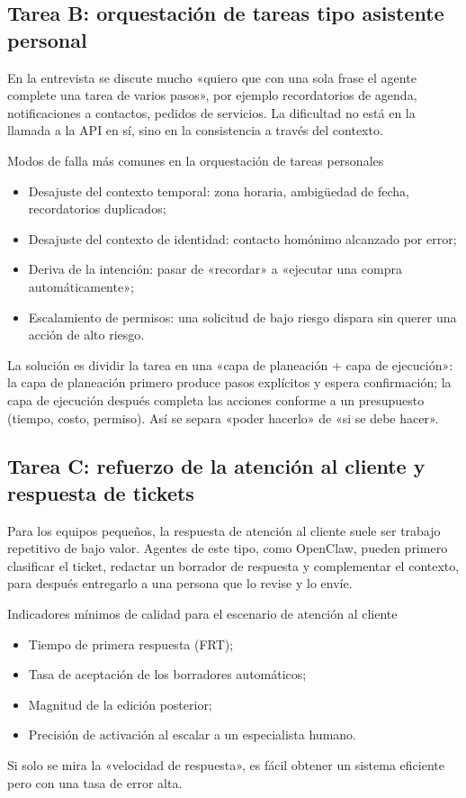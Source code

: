\documentclass[a4paper]{article}
\begin{document}
\subsection{Tarea B: orquestación de tareas tipo asistente personal}

En la entrevista se discute mucho «quiero que con una sola frase el agente complete una tarea de varios pasos», por ejemplo recordatorios de agenda, notificaciones a contactos, pedidos de servicios. La dificultad no está en la llamada a la API en sí, sino en la consistencia a través del contexto.

\begin{warningbox}{Modos de falla más comunes en la orquestación de tareas personales}
\begin{itemize}
    \item Desajuste del contexto temporal: zona horaria, ambigüedad de fecha, recordatorios duplicados;
    \item Desajuste del contexto de identidad: contacto homónimo alcanzado por error;
    \item Deriva de la intención: pasar de «recordar» a «ejecutar una compra automáticamente»;
    \item Escalamiento de permisos: una solicitud de bajo riesgo dispara sin querer una acción de alto riesgo.
\end{itemize}
\end{warningbox}

La solución es dividir la tarea en una «capa de planeación + capa de ejecución»: la capa de planeación primero produce pasos explícitos y espera confirmación; la capa de ejecución después completa las acciones conforme a un presupuesto (tiempo, costo, permiso). Así se separa «poder hacerlo» de «si se debe hacer».

\subsection{Tarea C: refuerzo de la atención al cliente y respuesta de tickets}

Para los equipos pequeños, la respuesta de atención al cliente suele ser trabajo repetitivo de bajo valor. Agentes de este tipo, como OpenClaw, pueden primero clasificar el ticket, redactar un borrador de respuesta y complementar el contexto, para después entregarlo a una persona que lo revise y lo envíe.

\begin{knowledgebox}{Indicadores mínimos de calidad para el escenario de atención al cliente}
\begin{itemize}
    \item Tiempo de primera respuesta (FRT);
    \item Tasa de aceptación de los borradores automáticos;
    \item Magnitud de la edición posterior;
    \item Precisión de activación al escalar a un especialista humano.
\end{itemize}
Si solo se mira la «velocidad de respuesta», es fácil obtener un sistema eficiente pero con una tasa de error alta.
\end{knowledgebox}
\end{document}
